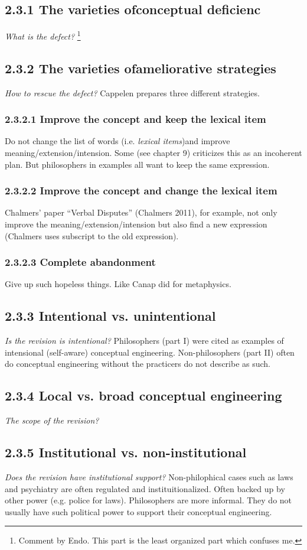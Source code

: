 \documentclass[
10pt, %
a4paper, %
twocolumn, %
landscape %
]{article}
\begin{document}
\subsection*{2.3.1 The varieties ofconceptual deficienc}
\emph{What is the defect?}
\footnote{Comment by Endo. This part is the least organized part which confuses me. }
\subsection*{2.3.2 The varieties ofameliorative strategies}
\emph{How to rescue the defect?} Cappelen prepares three different strategies.
\subsubsection*{2.3.2.1 Improve the concept and keep the lexical item}
Do not change the list of words (i.e. \emph{lexical items})and improve meaning/extension/intension.
Some (see chapter 9) criticizes this as an incoherent plan.
But philosophers in examples all want to keep the same expression.
\subsubsection*{2.3.2.2 Improve the concept and change the lexical item}
Chalmers' paper ``Verbal Disputes'' (Chalmers 2011), for example, not only improve the meaning/extension/intension but also find a new expression (Chalmers uses subscript to the old expression).
\subsubsection*{2.3.2.3 Complete abandonment}
Give up such hopeless things. Like Canap did for metaphysics.

\subsection*{2.3.3 Intentional vs. unintentional}
\emph{Is the revision is intentional?}
Philosophers (part I) were cited as examples of intensional (self-aware) conceptual engineering. Non-philosophers (part II) often do conceptual engineering without the practicers do not describe as such.
\subsection*{2.3.4 Local vs. broad conceptual engineering}
\emph{The scope of the revision?}
\subsection*{2.3.5 Institutional vs. non-institutional}
\emph{Does the revision have institutional support?}
Non-philophical cases such as laws and psychiatry are often regulated and instituitionalized. Often backed up by other power (e.g. police for laws). Philosophers are more informal. They do not usually have such political power to support their conceptual engineering.
\end{document}
